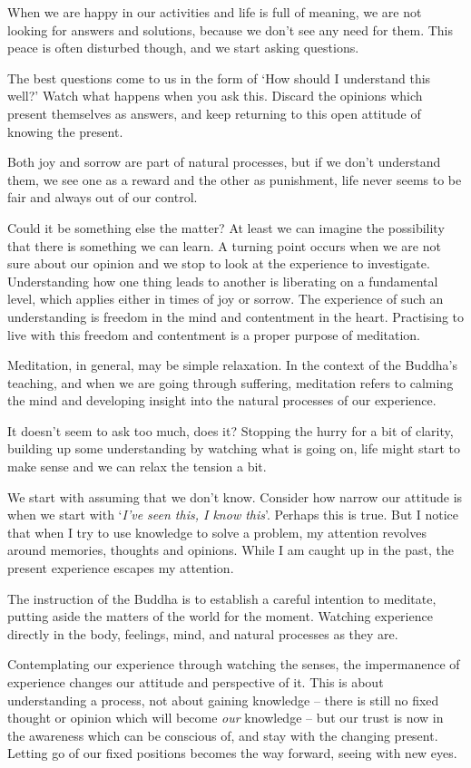 When we are happy in our activities and life is full of meaning, we are
not looking for answers and solutions, because we don't see any need for
them. This peace is often disturbed though, and we start asking
questions.

The best questions come to us in the form of `How should I understand
this well?' Watch what happens when you ask this. Discard the opinions
which present themselves as answers, and keep returning to this open
attitude of knowing the present.

Both joy and sorrow are part of natural processes, but if we don't
understand them, we see one as a reward and the other as punishment,
life never seems to be fair and always out of our control.

Could it be something else the matter? At least we can imagine the
possibility that there is something we can learn. A turning point occurs
when we are not sure about our opinion and we stop to look at the
experience to investigate. Understanding how one thing leads to another
is liberating on a fundamental level, which applies either in times of
joy or sorrow. The experience of such an understanding is freedom in the
mind and contentment in the heart. Practising to live with this freedom
and contentment is a proper purpose of meditation.

Meditation, in general, may be simple relaxation. In the context of the
Buddha's teaching, and when we are going through suffering, meditation
refers to calming the mind and developing insight into the natural
processes of our experience.

It doesn't seem to ask too much, does it? Stopping the hurry for a bit
of clarity, building up some understanding by watching what is going on,
life might start to make sense and we can relax the tension a bit.

We start with assuming that we don't know. Consider how narrow our
attitude is when we start with `\emph{I've seen this, I know this}'.
Perhaps this is true. But I notice that when I try to use knowledge to
solve a problem, my attention revolves around memories, thoughts and
opinions. While I am caught up in the past, the present experience
escapes my attention.

The instruction of the Buddha is to establish a careful intention to
meditate, putting aside the matters of the world for the moment.
Watching experience directly in the body, feelings, mind, and natural
processes as they are.

Contemplating our experience through watching the senses, the
impermanence of experience changes our attitude and perspective of it.
This is about understanding a process, not about gaining knowledge --
there is still no fixed thought or opinion which will become \emph{our}
knowledge -- but our trust is now in the awareness which can be
conscious of, and stay with the changing present. Letting go of our
fixed positions becomes the way forward, seeing with new eyes.

